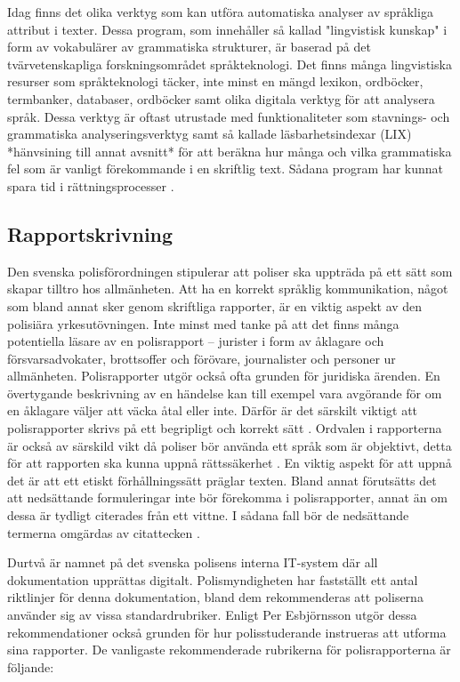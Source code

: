 \documentclass[swedish]{maucsthesis}
\begin{document}
Idag finns det olika verktyg som kan utföra automatiska analyser av språkliga
attribut i texter. Dessa program, som innehåller så kallad "lingvistisk kunskap"
i form av vokabulärer av grammatiska strukturer, är baserad på det
tvärvetenskapliga forskningsområdet språkteknologi. Det finns många lingvistiska
resurser som språkteknologi täcker, inte minst en mängd lexikon, ordböcker,
termbanker, databaser, ordböcker samt olika digitala verktyg för att analysera
språk. Dessa verktyg är oftast utrustade med funktionaliteter som stavnings- och
grammatiska analyseringsverktyg samt så kallade läsbarhetsindexar (LIX)
*hänvsining till annat avsnitt* för att beräkna hur många och vilka grammatiska
fel som är vanligt förekommande i en skriftlig text. Sådana program har kunnat
spara tid i rättningsprocesser \citep{wengelin:2017}.

\subsection{Rapportskrivning}

Den svenska polisförordningen stipulerar att poliser ska uppträda på ett sätt
som skapar tilltro hos allmänheten. Att ha en korrekt språklig kommunikation,
något som bland annat sker genom skriftliga rapporter, är en viktig aspekt av
den polisiära yrkesutövningen. Inte minst med tanke på att det finns många
potentiella läsare av en polisrapport – jurister i form av åklagare och
försvarsadvokater, brottsoffer och förövare, journalister och personer ur
allmänheten. Polisrapporter utgör också ofta grunden för juridiska ärenden. En
övertygande beskrivning av en händelse kan till exempel vara avgörande för om en
åklagare väljer att väcka åtal eller inte. Därför är det särskilt viktigt att
polisrapporter skrivs på ett begripligt och korrekt sätt \cite{ask:2013}.
Ordvalen i rapporterna är också av särskild vikt då poliser bör använda ett
språk som är objektivt, detta för att rapporten ska kunna uppnå rättssäkerhet
\citep{ask:2018}. En viktig aspekt för att uppnå det är att ett etiskt
förhållningssätt präglar texten. Bland annat förutsätts det att nedsättande
formuleringar inte bör förekomma i polisrapporter, annat än om dessa är tydligt
citerades från ett vittne. I sådana fall bör de nedsättande termerna omgärdas av
citattecken \cite{ask:2013}.

Durtvå är namnet på det svenska polisens interna IT-system där all dokumentation
upprättas digitalt. Polismyndigheten har fastställt ett antal riktlinjer för
denna dokumentation, bland dem rekommenderas att poliserna använder sig av vissa
standardrubriker. Enligt Per Esbjörnsson utgör dessa rekommendationer också
grunden för hur polisstuderande instrueras att utforma sina rapporter. De
vanligaste rekommenderade rubrikerna för polisrapporterna är följande:
\end{document}
